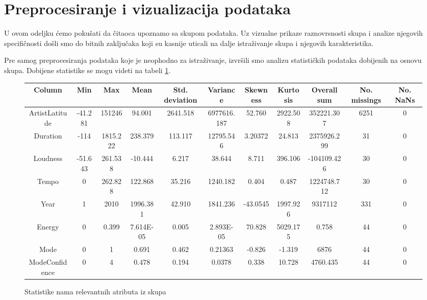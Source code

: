 \section{Preprocesiranje i vizualizacija podataka}
\label{sec:Preprocesiranje}

U ovom odeljku \'c{}emo poku\v{s}ati da \v{c}itaoca upoznamo sa skupom podataka. Uz vizualne prikaze raznovrsnosti skupa i analize njegovih specifi\v{c}nosti do\v{s}li smo do bitnih zaklju\v{c}aka koji su kasnije uticali na dalje istra\v{z}ivanje skupa i njegovih karakteristika.

Pre samog preprocesiranja podataka koje je neophodno za istra\v{z}ivanje, izvr\v{s}ili smo analizu statisti\v{c}kih podataka dobijenih na osnovu skupa. Dobijene statistike se mogu videti na tabeli \ref{table:stats}.

\begin{figure}[H]
    \footnotesize
    \begin{tabular}{|c|c|c|c|c|c|c|c|c|c|c|}
        \hline
        Column & Min & Max & Mean & Std. deviation & Variance & Skewness & Kurtosis & Overall sum & No. missings & No. NaNs \\
        \hline
        ArtistLatitude & -41.281 & 151246 & 94.001 & 2641.518 & 6977616.187 & 52.760 & 2922.508 & 352221.307 & 6251 & 0 \\
        
        Duration & -114 & 1815.222 & 238.379 & 113.117 & 12795.546 & 3.20372 & 24.813 & 2375926.299 & 31 & 0 \\
        Loudness & -51.643 & 261.538 & -10.444 & 6.217 & 38.644 & 8.711 & 396.106 & -104109.426 & 30 & 0 \\
        Tempo & 0 & 262.828 & 122.868 & 35.216 & 1240.182 & 0.404 & 0.487 & 1224748.712 & 30 & 0 \\
        Year & 1 & 2010 & 1996.381 & 42.910 & 1841.236 & -43.0545 & 1997.926 & 9317112 & 331 & 0 \\

        Energy & 0 & 0.399 & 7.614E-05 & 0.005 & 2.893E-05 & 70.828 & 5029.175 & 0.758 & 44 & 0 \\
        Mode & 0 & 1 & 0.691 & 0.462 & 0.21363 & -0.826 & -1.319 & 6876 & 44 & 0 \\
        
        ModeConfidence & 0 & 4 & 0.478 & 0.194 & 0.0378 & 0.338 & 10.728 & 4760.435 & 44 & 0 \\
        
        \hline
    \end{tabular}
    \caption{Statistike nama relevantnih atributa iz skupa}
    \label{table:stats}
\end{figure}

